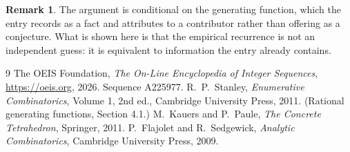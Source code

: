 \documentclass[11pt,a4paper]{article}
\theoremstyle{plain}
\theoremstyle{definition}
\newtheorem{remark}[theorem]{Remark}
\begin{document}
\begin{remark}
The argument is conditional on the generating function, which the entry records as a fact and
attributes to a contributor rather than offering as a conjecture. What is shown here is that
the empirical recurrence is not an independent guess: it is equivalent to information the
entry already contains.
\end{remark}

\begin{thebibliography}{9}
 The OEIS Foundation, \emph{The On-Line Encyclopedia of Integer
Sequences}, \url{https://oeis.org}, 2026. Sequence A225977.
 R.~P.~Stanley, \emph{Enumerative Combinatorics}, Volume 1, 2nd ed.,
Cambridge University Press, 2011. (Rational generating functions, Section 4.1.)
 M.~Kauers and P.~Paule, \emph{The Concrete Tetrahedron}, Springer, 2011.
 P.~Flajolet and R.~Sedgewick, \emph{Analytic Combinatorics}, Cambridge
University Press, 2009.
\end{thebibliography}
\end{document}
